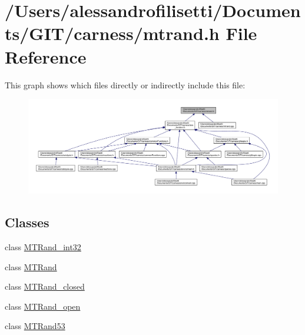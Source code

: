 \hypertarget{a00073}{\section{/\+Users/alessandrofilisetti/\+Documents/\+G\+I\+T/carness/mtrand.h File Reference}
\label{a00073}
}
This graph shows which files directly or indirectly include this file\+:\nopagebreak
\begin{figure}[H]
\begin{center}
\leavevmode
\includegraphics[width=350pt]{a00195}
\end{center}
\end{figure}
\subsection*{Classes}
\begin{DoxyCompactItemize}
\item 
class \hyperlink{a00018}{M\+T\+Rand\+\_\+int32}
\item 
class \hyperlink{a00015}{M\+T\+Rand}
\item 
class \hyperlink{a00017}{M\+T\+Rand\+\_\+closed}
\item 
class \hyperlink{a00019}{M\+T\+Rand\+\_\+open}
\item 
class \hyperlink{a00016}{M\+T\+Rand53}
\end{DoxyCompactItemize}
